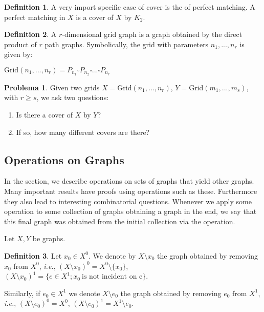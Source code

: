 \documentclass[]{article}
\theoremstyle{definition}
\newtheorem{definition}{Definition}[section]
\newtheorem{problem}{Problema}[section]
\theoremstyle{definition}
\newcommand{\ie}{\textit{i.e.}}
\begin{document}
	\begin{definition}
		A very import specific case of cover is the of perfect matching. A perfect matching in $X$ is a cover of $X$ by $K_2$.
	\end{definition}
	
	\begin{definition}
		A $r$-dimensional grid graph is a graph obtained by the direct product of $r$ path graphs. Symbolically, the grid with parameters $n_1, ..., n_r$ is given by:
		
		\begin{center}
			$\text{Grid}(n_1, ..., n_r) = P_{n_1}\square P_{n_2} \square... \square P_{n_r}$
		\end{center}
		
	\end{definition}
	
	\begin{problem}
		Given two grids $X = \text{Grid}(n_1, ..., n_r)$, $Y = \text{Grid}(m_1, ..., m_s)$, with $r \geq s$, we ask two questions:
		
		\begin{enumerate}
			\item Is there a cover of $X$ by $Y$?
			
			\item If so, how many different covers are there?
		\end{enumerate}	
	\end{problem}
	
	\subsection{Operations on Graphs}
	
	In the section, we describe operations on sets of graphs that yield other graphs. Many important results have proofs using operations such as these. Furthermore they also lead to interesting combinatorial questions. Whenever we apply some operation to some collection of graphs obtaining a graph in the end, we say that this final graph was obtained from the initial collection via the operation.
	
	Let $X, Y$ be graphs. 
	
	\begin{definition}
		Let $x_0 \in X^0$. We denote by $X \setminus x_0$ the graph obtained by removing $x_0$ from $X^0$, \ie, $(X \setminus x_0)^0 = X^0 \setminus \{x_0\}$, $(X \setminus x_0)^1 = \{e \in X^1; x_0 \ \text{is not incident on e} \}$.
		
		Similarly, if $e_0 \in X^1$ we denote $X \setminus e_0$ the graph obtained by removing $e_0$ from $X^1$, \ie, $(X \setminus e_0)^0 = X^0$, $(X \setminus e_0)^1 = X^1 \setminus e_0$.
	\end{definition}
	
\end{document}
